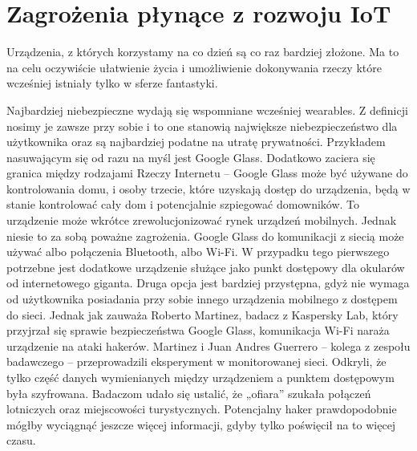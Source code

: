 \documentclass[brudnopis]{xmgr}
\begin{document}
\section{Zagrożenia płynące z rozwoju IoT}
Urządzenia, z których korzystamy na co dzień są co raz bardziej złożone. Ma to na celu oczywiście ułatwienie życia i umożliwienie dokonywania rzeczy które wcześniej istniały tylko w sferze fantastyki. 

Najbardziej niebezpieczne wydają się wspomniane wcześniej wearables. Z definicji nosimy je zawsze przy sobie i to one stanowią największe niebezpieczeństwo dla użytkownika oraz są najbardziej podatne na utratę prywatności. Przykładem nasuwającym się od razu na myśl jest Google Glass. Dodatkowo zaciera się granica między rodzajami Rzeczy Internetu – Google Glass może być używane do kontrolowania domu, i osoby trzecie, które uzyskają dostęp do urządzenia, będą w stanie kontrolować cały dom i potencjalnie  szpiegować domowników.
To urządzenie może wkrótce zrewolucjonizować rynek urządzeń mobilnych. Jednak niesie to za sobą poważne zagrożenia. Google Glass do komunikacji z siecią może używać albo połączenia Bluetooth, albo Wi-Fi. W przypadku tego pierwszego potrzebne jest dodatkowe urządzenie służące jako punkt dostępowy dla okularów od internetowego giganta. Druga opcja jest bardziej przystępna, gdyż nie wymaga od użytkownika posiadania przy sobie innego urządzenia mobilnego z dostępem do sieci. Jednak jak zauważa Roberto Martinez, badacz z Kaspersky Lab, który przyjrzał się sprawie bezpieczeństwa Google Glass, komunikacja Wi-Fi naraża urządzenie na ataki hakerów. Martinez i Juan Andres Guerrero – kolega z zespołu badawczego – przeprowadzili eksperyment w monitorowanej sieci. Odkryli, że tylko część danych wymienianych między urządzeniem a punktem dostępowym była szyfrowana. Badaczom udało się ustalić, że „ofiara” szukała połączeń lotniczych oraz miejscowości turystycznych. Potencjalny haker prawdopodobnie mógłby wyciągnąć jeszcze więcej informacji, gdyby tylko poświęcił na to więcej czasu.
\end{document}
